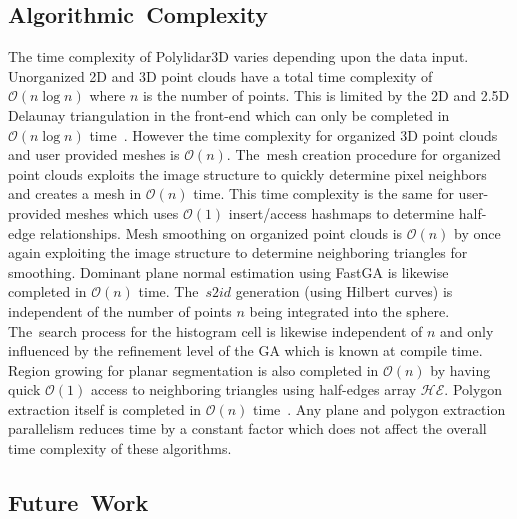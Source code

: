 \subsection{Algorithmic~Complexity}


The time complexity of Polylidar3D varies depending upon the data input.  Unorganized 2D and 3D point clouds have a total time complexity of $\mathcal{O}(n\log{}n)$ where $n$ is the number of points. This is limited by the 2D and 2.5D Delaunay triangulation in the front-end which can only be completed in $\mathcal{O}(n\log{}n)$ time~\cite{de_berg_delaunay_2008}. However the time complexity for organized 3D point clouds and user provided meshes is $\mathcal{O}(n)$. The~mesh creation procedure for organized point clouds exploits the image structure to quickly determine pixel neighbors and creates a mesh in $\mathcal{O}(n)$ time. This time complexity is the same for user-provided meshes which uses $\mathcal{O}(1)$ insert/access hashmaps to determine half-edge relationships. Mesh smoothing on organized point clouds is $\mathcal{O}(n)$ by once again exploiting the image structure to determine neighboring triangles for smoothing. Dominant plane normal estimation using FastGA is likewise completed in $\mathcal{O}(n)$  time. The~$s2id$ generation (using Hilbert curves) is independent of the number of points $n$ being integrated into the sphere. The~search process for the histogram cell is likewise independent of $n$ and only influenced by the refinement level of the GA which is known at compile time. Region growing for planar segmentation is also completed in $\mathcal{O}(n)$ by having quick $\mathcal{O}(1)$ access to neighboring triangles using half-edges array $\mathcal{HE}$. Polygon extraction itself is completed in $\mathcal{O}(n)$ time~\cite{castagno_polylidar_2020}. Any plane and polygon extraction parallelism reduces time by a constant factor which does not affect the overall time complexity of these algorithms. %

\subsection{Future~Work}\label{sec:ch3_dicsussion_future_work}

